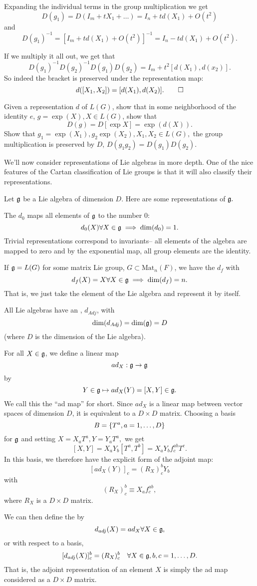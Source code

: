 Expanding the individual terms in the group multiplication we get
$$D(g_1)=D(I_m+tX_1+\ldots)=I_n+t d(X_1)+O(t^2)$$
and
$$D(g_1)^{-1}=[I_m+td(X_1)+O(t^2)]^{-1}=I_n-td(X_1)+O(t^2).$$

If we multiply it all out, we get that
$$D(g_1)^{-1}D(g_2)^{-1}D(g_1)D(g_2)=I_m+t^2[d(X_1),d(x_2)].$$
So indeed the bracket is preserved under the representation map:
$$d([X_1,X_2])=[d(X_1),d(X_2)].\qed$$

\begin{ex}%
Given a representation $d$ of $L(G)$, show that in some neighborhood of the identity $e$, $g=\exp(X),X\in L(G)$, show that
$$D(g)=D[\exp X] = \exp(d(X)).$$
Show that $g_1=\exp (X_1), g_2 \exp(X_2), X_1,X_2\in L(G),$ the group multiplication is preserved by $D$, $D(g_1g_2)=D(g_1)D(g_2).$
\end{ex}

We'll now consider representations of Lie algebras in more depth. One of the nice features of the Cartan classification of Lie groups is that it will also classify their representations.

Let $\mathfrak{g}$ be a Lie algebra of dimension $D$. Here are some representations of $\mathfrak{g}.$
\begin{defn}
The  $d_0$ maps all elements of $\mathfrak{g}$ to the number $0$:
$$d_0(X)\forall X\in \mathfrak{g} \implies \dim(d_0)=1.$$
Trivial representations correspond to invariants-- all elements of the algebra are mapped to zero and by the exponential map, all group elements are the identity.
\end{defn}
\begin{defn}
If $\mathfrak{g}=L(G)$ for some matrix Lie group, $G\subset \text{Mat}_n(F)$, we have the  $d_f$ with
$$d_f(X)=X\forall X\in \mathfrak{g} \implies \dim(d_f)=n.$$
That is, we just take the element of the Lie algebra and represent it by itself.
\end{defn}
\begin{defn}
All Lie algebras have an , $d_{Adj}$, with
$$\dim(d_{Adj})=\dim(\mathfrak{g})=D$$
(where $D$ is the dimension of the Lie algebra).

For all $X\in \mathfrak{g}$, we define a linear map
$$ad_X:\mathfrak{g} \to \mathfrak{g}$$
by
$$Y\in \mathfrak{g} \mapsto ad_X(Y) = [X,Y]\in \mathfrak{g}.$$
We call this the ``ad map'' for short. Since $ad_X$ is a linear map between vector spaces of dimension $D$, it is equivalent to a $D\times D$ matrix. Choosing a basis
$$B=\{T^a,a=1,\ldots,D\}$$
for $\mathfrak{g}$ and setting
$X=X_a T^a, Y=Y_a T^a,$
we get
$$ [X,Y]=X_a Y_b [T^a,T^b]=X_a Y_b f^{ab}_c T^c.$$
In this basis, we therefore have the explicit form of the adjoint map:
$$[ad_X(Y)]_c=(R_X)^b_c Y_b$$
with
$$(R_X)^b_c \equiv X_a f^{ab}_c,$$
where $R_X$ is a $D\times D$ matrix.

We can then define the  by
$$d_{adj}(X)=ad_X \forall X\in \mathfrak{g},$$
or with respect to a basis,
$$[d_{adj}(X)]^b_c = (R_X)^b_c \quad \forall X\in \mathfrak{g}, b,c=1,\ldots, D.$$
That is, the adjoint representation of an element $X$ is simply the ad map considered as a $D\times D$ matrix.
\end{defn}

